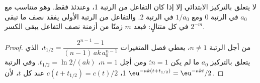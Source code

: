 \begin{proposition}\label{prop:b1:rate-laws:half-life-test}
لا يتعلق  بالتركيز الابتدائي إلا إذا كان
التفاعل من الرتبة 1، وعندئذ فقط. وهو متناسب مع $a_0$ في الرتبة 0
ومع $1/a_0$ في الرتبة 2. والتفاعل من الرتبة الأولى يفقد نصف ما تبقى
في كل  متتالٍ: فبعد $m$ زمنًا من أزمنة نصف التفاعل يبقى الكسر $2^{-m}$.
\end{proposition}

\begin{proof}
من أجل الرتبة $n \ne 1$، يعطي فصل المتغيرات $t_{1/2} = \dfrac{2^{n-1} -
1}{(n-1)\,ak\,a_0^{n-1}}$، الذي يتعلق بالتركيز $a_0$ ما لم يكن $n = 1$؛ ومن أجل
$n = 1$، $t_{1/2} = \ln2/(ak)$. وفي الرتبة 1، $c(t + t_{1/2}) = c(t)/2$ عند
كل $t$، لأن $\eu^{-ak(t + t_{1/2})} = \eu^{-akt}/2$.
\end{proof}

